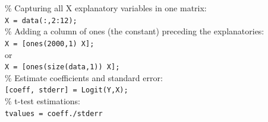 \documentclass[11pt, english]{article}
\begin{document}
	\% Capturing all X explanatory variables in one matrix:\\
	\texttt{X = data(:,2:12);}\\

	\% Adding a column of ones (the constant) preceding the explanatories:\\
	\texttt{X = [ones(2000,1) X];}\\
	or\\
	\texttt{X = [ones(size(data,1)) X];}\\

	\% Estimate coefficients and standard error:\\
	\texttt{[coeff, stderr] = Logit(Y,X);}\\

	\% t-test estimations:\\
	\texttt{tvalues = coeff./stderr}

\newpage

\renewcommand\refname{Bibliography}
\end{document}
